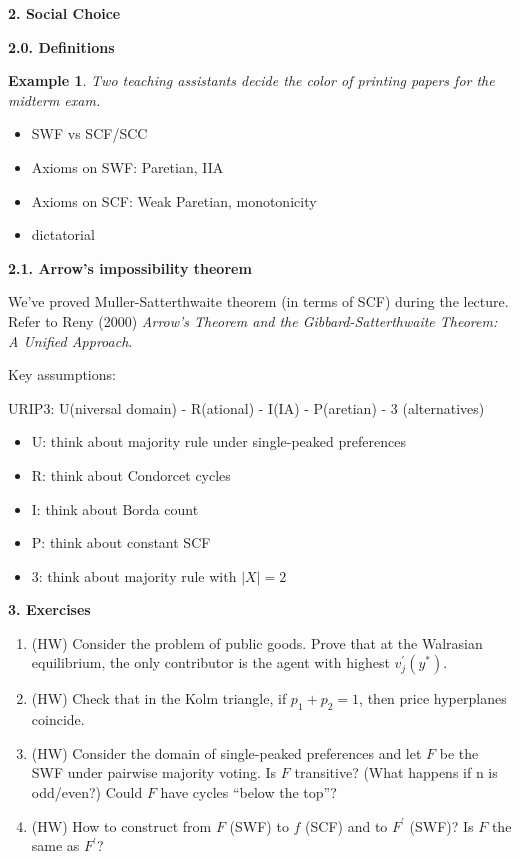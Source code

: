 \documentclass[11pt,leqno]{article}
\newtheorem{example}{Example}
\begin{document}
\newpage
\textbf{2. Social Choice}

\textbf{2.0. Definitions}

\begin{example}
Two teaching assistants decide the color of printing papers for the midterm exam.
\end{example}

\begin{itemize}
    \item SWF vs SCF/SCC
    \item Axioms on SWF: Paretian, IIA
    \item Axioms on SCF: Weak Paretian, monotonicity
    \item dictatorial
\end{itemize}

\textbf{2.1. Arrow's impossibility theorem}

We've proved Muller-Satterthwaite theorem (in terms of SCF) during the lecture. Refer to Reny (2000) \textit{Arrow’s Theorem and the Gibbard-Satterthwaite Theorem: A Unified Approach}.

Key assumptions:

URIP3: U(niversal domain) - R(ational) - I(IA) - P(aretian) - 3 (alternatives) 

\begin{itemize}
    \item U: think about majority rule under single-peaked preferences
    \item R: think about Condorcet cycles
    \item I: think about Borda count
    \item P: think about constant SCF
    \item 3: think about majority rule with $|X|=2$
\end{itemize}

\textbf{3. Exercises}
\begin{enumerate}
    \item (HW) Consider the problem of public goods. Prove that at the Walrasian equilibrium, the only contributor is the agent with highest $v_{j}^{\prime}(y^{*})$.
    \item (HW) Check that in the Kolm triangle, if $p_{1}+p_{2}=1$, then price hyperplanes coincide.
    \item (HW) Consider the domain of single-peaked preferences and let $F$ be the SWF under pairwise majority voting. Is $F$ transitive? (What happens if n is odd/even?) Could $F$ have cycles ``below the top''?
    \item (HW) How to construct from $F$ (SWF) to $f$ (SCF) and to $F^{\prime}$ (SWF)?
    Is $F$ the same as $F^{\prime}$?
\end{enumerate}
\end{document}
